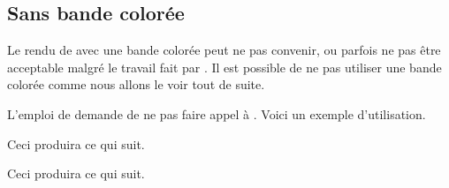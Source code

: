 \documentclass[12pt, a4paper]{article}
\begin{document}
\subsection{Sans bande colorée}

Le rendu de  avec une bande colorée peut ne pas convenir, ou parfois ne pas être acceptable malgré le travail fait par .
Il est possible de ne pas utiliser une bande colorée comme nous allons le voir tout de suite.


\begin{tdocexa}
    L'emploi de  demande de ne pas faire appel à .
    Voici un exemple d'utilisation.


    Ceci produira ce qui suit.

    \medskip

    
\end{tdocexa}




\begin{tdocexa}
    \leavevmode


    Ceci produira ce qui suit.

    \medskip

    
\end{tdocexa}
\end{document}
